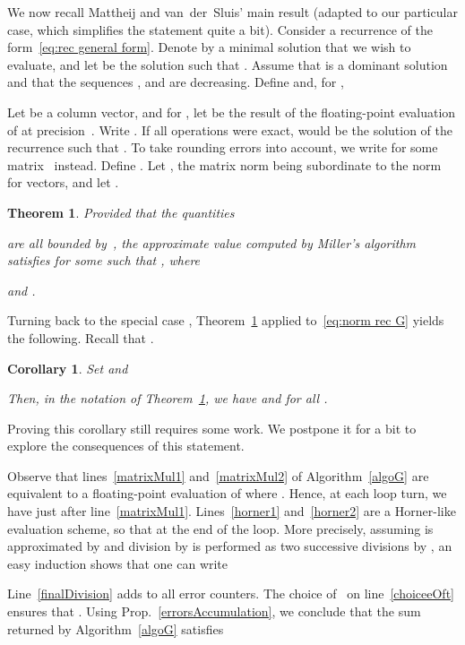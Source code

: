 \documentclass[10pt, conference]{IEEEtran}
\newtheorem{corollary}{Corollary}
\newtheorem{theorem}{Theorem}
\begin{document}
We now recall Mattheij and van~der~Sluis' main result (adapted to our particular case, which simplifies the statement quite a bit).
Consider a recurrence of the form~\eqref{eq:rec general form}. Denote by  a minimal solution that we wish to evaluate, and let  be the solution such that . Assume that  is a dominant solution and that the sequences ,  and  are decreasing. Define  and, for ,

Let  be a column vector, and for , let  be the result of the floating-point evaluation of  at precision~. Write . If all operations were exact,  would be the solution of the recurrence such that . To take rounding errors into account, we write   for some matrix~ instead. Define . Let ,  the matrix norm being subordinate to the  norm for vectors, and let . 

\begin{theorem} \cite[Theorem~4.1]{MvdS}
\label{thm:MvdS}
Provided that the quantities

are all bounded by~, the approximate value  computed by Miller's algorithm satisfies
 for some  such that , where

and .
\end{theorem}

Turning back to the special case , Theorem~\ref{thm:MvdS} applied to~\eqref{eq:norm rec G} yields the following.
Recall that .

\begin{corollary}
\label{cor:MvdS to our case}
Set  and

Then, in the notation of Theorem~\ref{thm:MvdS}, we have
 and 
for all .
\end{corollary}

Proving this corollary still requires some work. We postpone it for a bit to explore the consequences of this statement.

Observe that lines~\ref{matrixMul1} and~\ref{matrixMul2} of Algorithm~\ref{algoG} are equivalent to a floating-point evaluation of  where . Hence, at each loop turn, we have  just after line~\ref{matrixMul1}. Lines~\ref{horner1} and~\ref{horner2} are a Horner-like evaluation scheme, so that  at the end of the loop. More precisely, assuming  is approximated by  and division by  is performed as two successive divisions by , an easy induction shows that one can write

Line~\ref{finalDivision} adds  to all error counters. The choice of~ on line~\ref{choiceeOft} ensures that .  Using Prop.~\ref{errorsAccumulation}, we conclude that the sum~ returned by Algorithm~\ref{algoG} satisfies
\end{document}
